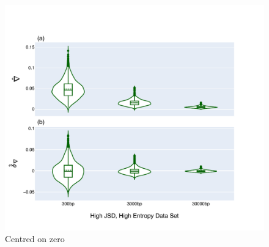 \begin{figure}[!ht]
\centering
\includegraphics[width=\textwidth]{figures/plots/synthetic/d-conv-vs-conv/High JSD, High Entropy.pdf}
\caption{Centred on zero}
\label{fig:synthetic/d-conv-vs-conv/HighJSDHighEntropy}
\end{figure}